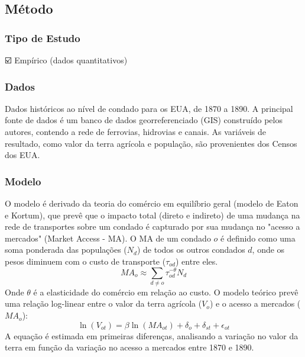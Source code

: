 \documentclass[12pt]{article}
\begin{document}
\subsection*{Método}

\subsubsection*{Tipo de Estudo}
☑️ Empírico (dados quantitativos)

\subsubsection*{Dados}
Dados históricos ao nível de condado para os EUA, de 1870 a 1890. A principal fonte de dados é um banco de dados georreferenciado (GIS) construído pelos autores, contendo a rede de ferrovias, hidrovias e canais. As variáveis de resultado, como valor da terra agrícola e população, são provenientes dos Censos dos EUA.

\subsubsection*{Modelo}
O modelo é derivado da teoria do comércio em equilíbrio geral (modelo de Eaton e Kortum), que prevê que o impacto total (direto e indireto) de uma mudança na rede de transportes sobre um condado é capturado por sua mudança no "acesso a mercados" (Market Access - MA). O MA de um condado $o$ é definido como uma soma ponderada das populações ($N_d$) de todos os outros condados $d$, onde os pesos diminuem com o custo de transporte ($\tau_{od}$) entre eles.
\begin{equation*}
    MA_o \approx \sum_{d \neq o} \tau_{od}^{-\theta} N_d
\end{equation*}
Onde $\theta$ é a elasticidade do comércio em relação ao custo. O modelo teórico prevê uma relação log-linear entre o valor da terra agrícola ($V_o$) e o acesso a mercados ($MA_o$):
\begin{equation*}
    \ln(V_{ot}) = \beta \ln(MA_{ot}) + \delta_o + \delta_{st} + \epsilon_{ot}
\end{equation*}
A equação é estimada em primeiras diferenças, analisando a variação no valor da terra em função da variação no acesso a mercados entre 1870 e 1890.
\end{document}
